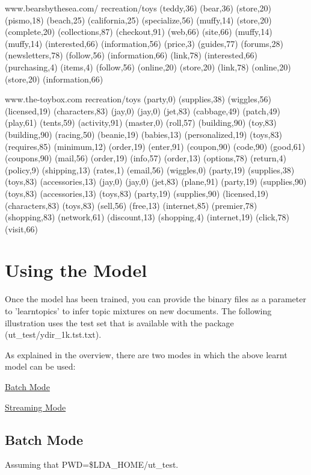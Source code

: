 {\ttfamily www.bearsbythesea.com/ recreation/toys (teddy,36) (bear,36) (store,20) (pismo,18) (beach,25) (california,25) (specialize,56) (muffy,14) (store,20) (complete,20) (collections,87) (checkout,91) (web,66) (site,66) (muffy,14) (muffy,14) (interested,66) (information,56) (price,3) (guides,77) (forums,28) (newsletters,78) (follow,56) (information,66) (link,78) (interested,66) (purchasing,4) (items,4) (follow,56) (online,20) (store,20) (link,78) (online,20) (store,20) (information,66)  }

{\ttfamily www.the-\/toybox.com recreation/toys (party,0) (supplies,38) (wiggles,56) (licensed,19) (characters,83) (jay,0) (jay,0) (jet,83) (cabbage,49) (patch,49) (play,61) (tents,59) (activity,91) (master,0) (roll,57) (building,90) (toy,83) (building,90) (racing,50) (beanie,19) (babies,13) (personalized,19) (toys,83) (requires,85) (minimum,12) (order,19) (enter,91) (coupon,90) (code,90) (good,61) (coupons,90) (mail,56) (order,19) (info,57) (order,13) (options,78) (return,4) (policy,9) (shipping,13) (rates,1) (email,56) (wiggles,0) (party,19) (supplies,38) (toys,83) (accessories,13) (jay,0) (jay,0) (jet,83) (plane,91) (party,19) (supplies,90) (toys,83) (accessories,13) (toys,83) (party,19) (supplies,90) (licensed,19) (characters,83) (toys,83) (sell,56) (free,13) (internet,85) (premier,78) (shopping,83) (network,61) (discount,13) (shopping,4) (internet,19) (click,78) (visit,66)  } \hypertarget{single__machine__usage_using_model}{}\section{Using the Model}\label{single__machine__usage_using_model}
Once the model has been trained, you can provide the binary files as a parameter to 'learntopics' to infer topic mixtures on new documents. The following illustration uses the test set that is available with the package (ut\_\-test/ydir\_\-1k.tst.txt). 

As explained in the overview, there are two modes in which the above learnt model can be used: 
\begin{DoxyEnumerate}
\item \hyperlink{single__machine__usage_batch_mode}{Batch Mode} 
\item \hyperlink{single__machine__usage_stream_mode}{Streaming Mode} 
\end{DoxyEnumerate}\hypertarget{single__machine__usage_batch_mode}{}\subsection{Batch Mode}\label{single__machine__usage_batch_mode}
Assuming that PWD=\$LDA\_\-HOME/ut\_\-test. {\ttfamily  }

